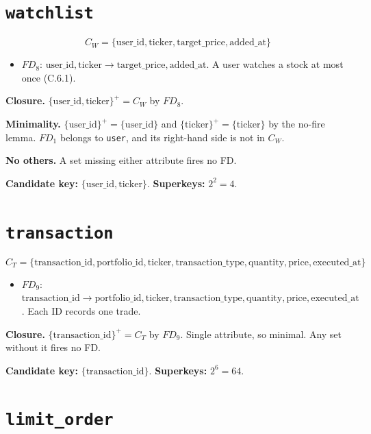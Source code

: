 \documentclass{article}
\newcommand{\at}[1]{\text{#1}}
\newcommand{\cl}[1]{\{#1\}^+}
\newcommand{\fdl}[1]{\hyperref[fd:#1]{$FD_{#1}$}}
\newcommand{\fd}[4]{\item \phantomsection\label{fd:#1}$FD_{#1}$: $#2 \rightarrow #3$. #4}
\begin{document}
\section{\texttt{watchlist}}\label{r:watchlist}

\[ C_W = \{\at{user\_id}, \at{ticker}, \at{target\_price}, \at{added\_at}\} \]

\begin{itemize}[nosep]
  \fd{8}{\at{user\_id}, \at{ticker}}{\at{target\_price}, \at{added\_at}}{A user watches a stock at most once (C.6.1).}
\end{itemize}

\textbf{Closure.} $\cl{\at{user\_id}, \at{ticker}} = C_W$ by \fdl{8}.

\textbf{Minimality.} $\cl{\at{user\_id}} = \{\at{user\_id}\}$ and $\cl{\at{ticker}} = \{\at{ticker}\}$ by the no-fire lemma. \fdl{1} belongs to \texttt{user}, and its right-hand side is not in $C_W$.

\textbf{No others.} A set missing either attribute fires no FD.

\textbf{Candidate key:} $\{\at{user\_id}, \at{ticker}\}$. \textbf{Superkeys:} $2^2 = 4$.

\section{\texttt{transaction}}\label{r:transaction}

\[ C_T = \{\at{transaction\_id}, \at{portfolio\_id}, \at{ticker}, \at{transaction\_type}, \at{quantity}, \at{price}, \at{executed\_at}\} \]

\begin{itemize}[nosep]
  \fd{9}{\at{transaction\_id}}{\at{portfolio\_id}, \at{ticker}, \at{transaction\_type}, \at{quantity}, \at{price}, \at{executed\_at}}{Each ID records one trade.}
\end{itemize}

\textbf{Closure.} $\cl{\at{transaction\_id}} = C_T$ by \fdl{9}. Single attribute, so minimal. Any set without it fires no FD.

\textbf{Candidate key:} $\{\at{transaction\_id}\}$. \textbf{Superkeys:} $2^6 = 64$.

\section{\texttt{limit\_order}}\label{r:limit_order}
\end{document}

